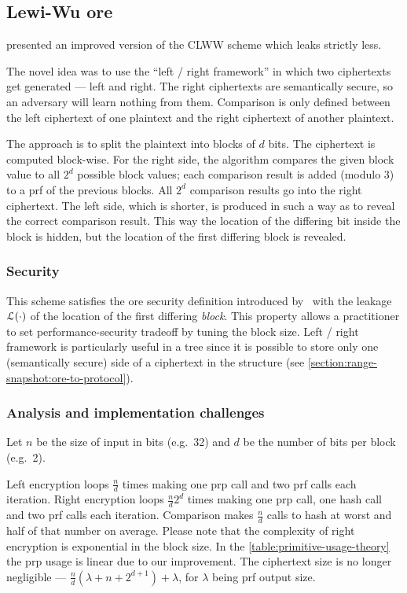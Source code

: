 \subsection{Lewi-Wu \acrshort{ore}}

	\textcite{lewi-wu-ore} presented an improved version of the CLWW scheme \cite{clww-ore} which leaks strictly less.

	The novel idea was to use the ``left / right framework'' in which two ciphertexts get generated --- left and right.
	The right ciphertexts are semantically secure, so an adversary will learn nothing from them.
	Comparison is only defined between the left ciphertext of one plaintext and the right ciphertext of another plaintext.

	The approach is to split the plaintext into blocks of $d$ bits.
	The ciphertext is computed block-wise.
	For the right side, the algorithm compares the given block value to all $2^d$ possible block values; each comparison result is added (modulo 3) to a \acrshort{prf} of the previous blocks.
	All $2^d$ comparison results go into the right ciphertext.
	The left side, which is shorter, is produced in such a way as to reveal the correct comparison result.
	This way the location of the differing bit inside the block is hidden, but the location of the first differing block is revealed.

	\subsubsection{Security}
		This scheme satisfies the \acrshort{ore} security definition introduced by~\textcite{clww-ore} with the leakage $\mathcal{L}(\cdot)$ of the location of the first differing \emph{block}.
		This property allows a practitioner to set performance-security tradeoff by tuning the block size.
		Left / right framework is particularly useful in a {\BPlus} tree since it is possible to store only one (semantically secure) side of a ciphertext in the structure (see \cref{section:range-snapshot:ore-to-protocol}).

	\subsubsection{Analysis and implementation challenges}

		Let $n$ be the size of input in bits (e.g.\ 32) and $d$ be the number of bits per block (e.g.\ 2).

		Left encryption loops $\frac{n}{d}$ times making one \acrshort{prp} call and two \acrshort{prf} calls each iteration.
		Right encryption loops $\frac{n}{d} 2^d$ times making one \acrshort{prp} call, one hash call and two \acrshort{prf} calls each iteration.
		Comparison makes $\frac{n}{d}$ calls to hash at worst and half of that number on average.
		Please note that the complexity of right encryption is exponential in the block size.
		In the \cref{table:primitive-usage-theory} the \acrshort{prp} usage is linear due to our improvement.
		The ciphertext size is no longer negligible --- $\frac{n}{d} \left(\lambda + n + 2^{d + 1} \right) + \lambda$, for $\lambda$ being \acrshort{prf} output size.

